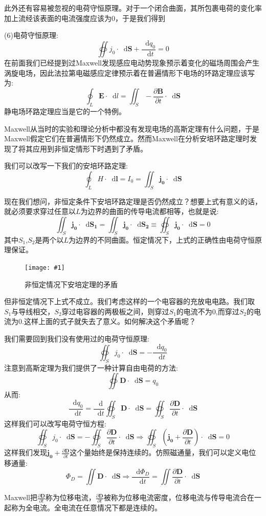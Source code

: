 \documentclass[12pt,a4paper,oneside]{report}
\theoremstyle{definition}
\theoremstyle{remark}
\newcommand{\insertfig}[3]{
    \begin{figure}[ht]
        \centering
        \texttt{[image: \#1]}
        \caption{#2}
        \label{fig:#1}
    \end{figure}
}
\newcommand{\mb}[1]{\mathbf{#1}}
\renewcommand{\d}{\mathop{}\!\mathrm{d}}
\begin{document}
此外还有容易被忽视的电荷守恒原理。对于一个闭合曲面，其所包裹电荷的变化率加上流经该表面的电流强度应该为$0$，于是我们得到

(6)电荷守恒原理:
\[
\oiint j_0 \cdot \d \mb{S} +\frac{\d q_0}{\d t}= 0
\]
在前面我们已经提到过Maxwell发现感应电动势现象预示着变化的磁场周围会产生涡旋电场，因此法拉第电磁感应定律预示着在普遍情形下电场的环路定理应该写为:
\[
\oint_L \mb{E} \cdot \d l = \iint_S -\frac{\partial \mb{B}}{\partial t} \cdot \d \mb{S}
\]
静电场环路定理应当是它的一个特例。

Maxwell从当时的实验和理论分析中都没有发现电场的高斯定理有什么问题，于是Maxwell假定它们在普遍情形下仍然成立。然而Maxwell在分析安培环路定理时发现了将其应用到非恒定情形下时遇到了矛盾。

我们可以改写一下我们的安培环路定理:
\[
\oint_L H \cdot \d \mb{l} = I_0 = \iint_S \mb{j_0} \cdot \d \mb{S} 
\]

现在我们想问，非恒定条件下安培环路定理是否仍然成立？想要上式有意义的话，就必须要求穿过任意以$L$为边界的曲面的传导电流都相等，也就是说:
\[
\iint_S \mb{j_0} \cdot \d \mb{S_1} = \iint_S \mb{j_0} \cdot \d \mb{S_2} \equiv \oiint_S  \mb{j_0} \cdot \d \mb{S} =0 
\]
其中$S_1$,$S_2$是两个以$L$为边界的不同曲面。恒定情况下，上式的正确性由电荷守恒原理保证。

\insertfig{5-3.png}{非恒定情况下安培定理的矛盾}{0.25}

但非恒定情况下上式不成立。我们考虑这样的一个电容器的充放电电路。我们取$S_1$与导线相交，$S_2$穿过电容器的两极板之间，则穿过$S_1$的电流不为$0$,而穿过$S_2$的电流为$0$.这样上面的式子就失去了意义。如何解决这个矛盾呢？

我们需要回到我们没有使用过的电荷守恒原理:
\[
\oiint_S j_0 \cdot \d \mb{S} = -\frac{\d q_0}{\d t}
\]
注意到高斯定理为我们提供了一种计算自由电荷的方法:
\[
\oiint \mathbf{D} \cdot \d \mathbf{S} = q_0
\]
从而:
\[
\frac{\d q_0}{\d t} = \frac{\d}{\d t}\oiint_S \mb{D} \cdot \d \mb{S} = \oiint_S \frac{\partial \mb{D}}{\partial t} \cdot \d \mb{S} 
\]
这样我们可以改写电荷守恒方程:
\[
\oiint_S j_0 \cdot \d \mb{S} = -\oiint_S \frac{\partial \mb{D}}{\partial t} \cdot \d \mb{S} \Rightarrow \oiint_S (\mb{j_0}+\frac{\partial \mb{D}}{\partial t})\cdot \d \mb{S} = 0
\]
这样我们发现$\mb{j_0}+\frac{\partial \mb{D}}{\partial t}$这个量始终是保持连续的。仿照磁通量，我们可以定义电位移通量:
\[
\Phi_D = \iint \mb{D} \cdot \d \mb{S} \Rightarrow \frac{\d \Phi_D}{\d t} = \iint \frac{\partial \mb{D}}{\partial t}\cdot \d \mb{S}
\]

Maxwell把$\frac{\partial \mb{D}}{\partial t}$称为位移电流，$\frac{\partial \mb{D}}{\partial t}$被称为位移电流密度，位移电流与传导电流合在一起称为全电流。全电流在任意情况下都是连续的。
\end{document}
